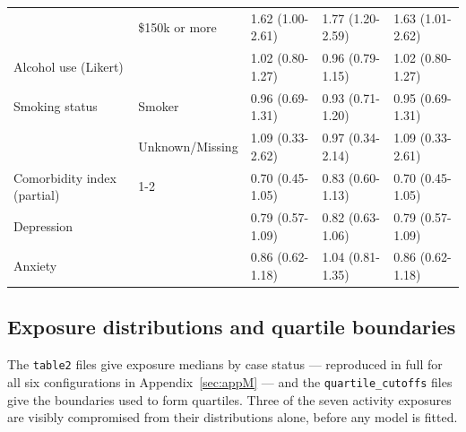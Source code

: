 \documentclass[11pt]{article}
\newcommand{\code}[1]{\texttt{\small #1}}
\begin{document}
\begin{longtable}{@{}p{3.4cm}p{2.6cm}p{2.3cm}p{2.3cm}p{2.3cm}@{}}
 & \$150k or more & 1.62 (1.00-2.61) & 1.77 (1.20-2.59) & 1.63 (1.01-2.62) \\
Alcohol use (Likert) &  & 1.02 (0.80-1.27) & 0.96 (0.79-1.15) & 1.02 (0.80-1.27) \\
Smoking status & Smoker & 0.96 (0.69-1.31) & 0.93 (0.71-1.20) & 0.95 (0.69-1.31) \\
 & Unknown/Missing & 1.09 (0.33-2.62) & 0.97 (0.34-2.14) & 1.09 (0.33-2.61) \\
Comorbidity index (partial) & 1-2 & 0.70 (0.45-1.05) & 0.83 (0.60-1.13) & 0.70 (0.45-1.05) \\
Depression &  & 0.79 (0.57-1.09) & 0.82 (0.63-1.06) & 0.79 (0.57-1.09) \\
Anxiety &  & 0.86 (0.62-1.18) & 1.04 (0.81-1.35) & 0.86 (0.62-1.18) \\
\bottomrule \end{longtable}\normalsize

\subsection{Exposure distributions and quartile boundaries}
\label{sec:res-dist}
The \code{table2} files give exposure medians by case status --- reproduced in full for all six
configurations in Appendix~\ref{sec:appM} --- and the \code{quartile_cutoffs} files
give the boundaries used to form quartiles. Three of the seven activity exposures are visibly
compromised from their distributions alone, before any model is fitted.
\end{document}
